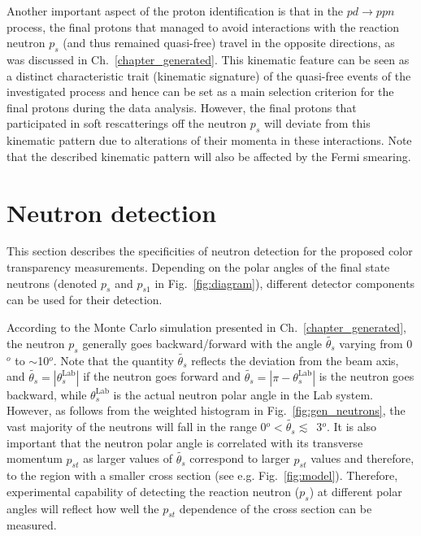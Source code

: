 Another important aspect of the proton identification is that in the $pd\rightarrow ppn$ process, the final protons that managed to avoid interactions with the reaction neutron $p_{s}$ (and thus remained quasi-free) travel in the opposite directions, as was discussed in Ch.~\ref{chapter_generated}. This kinematic feature can be seen as a distinct characteristic trait (kinematic signature) of the quasi-free events of the investigated process and hence can be set as a main selection criterion for the final protons during the data analysis. However, the final protons that participated in soft rescatterings off the neutron $p_{s}$ will deviate from this kinematic pattern due to alterations of their momenta in these interactions. Note that the described kinematic pattern will also be affected by the Fermi smearing. 



\section{Neutron detection}
\label{sec:neutron_det}
    

This section describes the specificities of neutron detection for the proposed color transparency measurements. Depending on the polar angles of the final state neutrons (denoted $p_{s}$ and $p_{s1}$ in Fig.~\ref{fig:diagram}), different detector components can be used for their detection.


According to the Monte Carlo simulation presented in Ch.~\ref{chapter_generated}, the neutron $p_{s}$ generally goes backward/forward with the angle $\widetilde{\theta_{s}}$ varying from 0$^o$ to $\sim$10$^o$. Note that the quantity $\widetilde{\theta_{s}}$ reflects the deviation from the beam axis, and $\widetilde{\theta_{s}} =\left | \theta_{s}^{\textrm{Lab}} \right |$ if the neutron goes forward and $\widetilde{\theta_{s}} = \left | \pi - \theta_{s}^{\textrm{Lab}}\right |$ is the neutron goes backward, while $\theta_{s}^{\textrm{Lab}}$ is the actual neutron polar angle in the Lab system. However, as follows from the weighted histogram in Fig.~\ref{fig:gen_neutrons}, the vast majority of the neutrons will fall in the range 0$^o < \widetilde{\theta_{s}}\lesssim$~3$^o$. It is also important that the neutron polar angle is correlated with its transverse momentum $p_{st}$ as larger values of $\widetilde{\theta_{s}}$ correspond to larger $p_{st}$ values and therefore, to the region with a smaller cross section (see e.g. Fig.~\ref{fig:model}). Therefore, experimental capability of detecting the reaction neutron ($p_{s}$) at different polar angles will reflect how well the $p_{st}$ dependence of the cross section can be measured. 





